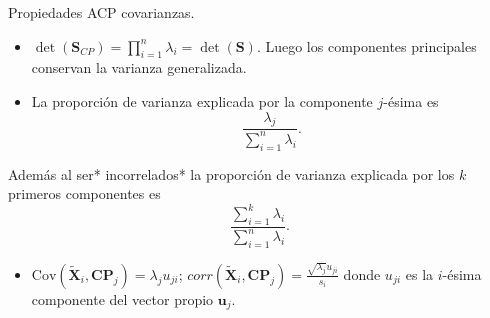 \documentclass[
  ignorenonframetext,
]{beamer}
\providecommand{\tightlist}{%
  \setlength{\itemsep}{0pt}\setlength{\parskip}{0pt}}
\begin{document}
\begin{frame}{Propiedades ACP covarianzas.}
\protect\hypertarget{propiedades-acp-covarianzas.-3}{}
\begin{itemize}
\item
  \(\det(\mathbf{S}_{CP})=\prod_{i=1}^n \lambda_i =\det(\mathbf{S})\).
  Luego los componentes principales conservan la varianza generalizada.
\item
  La proporción de varianza explicada por la componente \(j\)-ésima es
  \[\frac{\lambda_j}{\sum_{i=1}^n \lambda_i}.\]
\end{itemize}

Además al ser* incorrelados* la proporción de varianza explicada por los
\(k\) primeros componentes es \[\frac{\sum_{i=1}^k
\lambda_i}{\sum_{i=1}^n \lambda_i}.\]

\begin{itemize}
\tightlist
\item
  \(\mbox{Cov}(\tilde{\mathbf{X}}_i, \mathbf{CP}_j)=\lambda_j u_{j i}\);
  \(corr(\tilde{\mathbf{X}}_i, \mathbf{CP}_j)=\frac{\sqrt{\lambda_j} u_{j i}}{s_i}\)
  donde \(u_{j i}\) es la \(i\)-ésima componente del vector propio
  \(\mathbf{u}_j\).
\end{itemize}
\end{frame}
\end{document}
